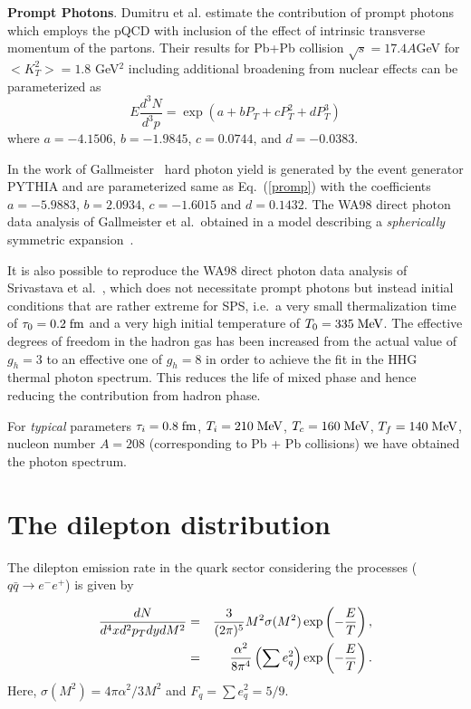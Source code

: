 \documentclass[aps,prc,preprint,superscriptaddress,showpacs,showkeys]{revtex4-1}
\begin{document}
{\bf Prompt Photons}. 
 Dumitru et al. \cite{DUMI} estimate the contribution of prompt photons 
which employs the pQCD with inclusion of the effect of intrinsic 
transverse momentum of the partons. Their results for Pb+Pb collision
$\sqrt{s} = 17.4 A$GeV for $<K_T^2>=1.8$ GeV$^2$ including additional 
broadening from nuclear effects can be parameterized as 
\begin{equation}\label{promp}
 E \frac{d^3 N}{d^3 p} = \exp(a + bP_T + cP_T^2 + dP_T^3)
\end{equation}
where $a=-4.1506$, $b=-1.9845$, $c=0.0744$, and 
$d=-0.0383$.

 In the work of Gallmeister~\cite{GALLMEISTER} hard photon 
 yield is generated by the event generator PYTHIA and are
parameterized same as Eq.~(\ref{promp}) with the coefficients
$a=-5.9883$, $b=2.0934$, $c=-1.6015$ and $d=0.1432$.
 The WA98 direct photon data analysis of Gallmeister et al.\ obtained in 
a model describing a {\em spherically} symmetric 
expansion~\cite{GALLMEISTER}.

 It is also possible to reproduce the WA98 direct photon data analysis of
Srivastava et al.~\cite{SRIVASTAVA}, which does not necessitate prompt
photons but instead initial conditions that are rather extreme for SPS, i.e.\ a
very small thermalization time of $\tau_0 = 0.2\;\mbox{fm}$ and a very high initial
temperature of $T_0 = 335\;\mbox{MeV}$. 
The effective degrees of freedom in the hadron gas has been increased
from the actual value of $g_h = 3$ to an effective one of $g_h =8$ in order 
to achieve the fit in the HHG thermal photon spectrum. This reduces
the life of mixed phase and hence reducing the contribution from 
hadron phase.


For {\em typical} parameters 
%
$\tau_i = 0.8\;\mbox{fm}$, $T_i = 210\;\mbox{MeV}$, $T_c = 160\;\mbox{MeV}$, $T_f = 140\;\mbox{MeV}$, 
%
nucleon number $A=208$ (corresponding to Pb + Pb collisions)
we have obtained the photon spectrum.










\section{The dilepton distribution}

 The dilepton emission rate in the quark sector considering the 
processes ($q \bar q \rightarrow e^- e^+$)
is given \cite{KAJA,VOGT} by 

\begin{eqnarray}\label{}
 {dN \over d^4x d^2p_T dy dM^2}
&=& \frac{3}{(2\pi)^5} M^2 \sigma(M^2)
        \exp\left(-\frac{E}{T}\right), \nonumber \\
&=& \frac{\alpha^2}{8\pi^4} \left(\sum e_q^2\right) 
        \exp\left(-\frac{E}{T}\right).
\end{eqnarray}
Here, $\sigma(M^2)=4\pi\alpha^2/3M^2$ and $F_q = \sum e_q^2 = 5/9$.
\end{document}
